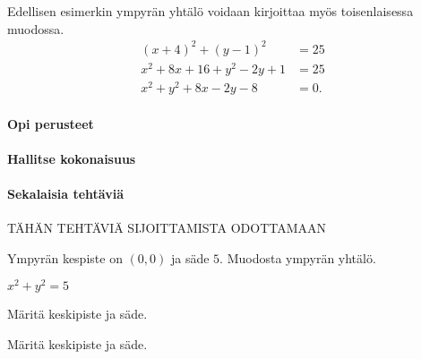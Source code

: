Edellisen esimerkin ympyrän yhtälö voidaan kirjoittaa myös toisenlaisessa muodossa.
\begin{align*}
(x+4)^2+(y-1)^2&=25 \\
x^2+8x+16+y^2-2y+1&=25 \\
x^2+y^2+8x-2y-8&=0.
\end{align*}

\begin{tehtavasivu}

\paragraph*{Opi perusteet}

\paragraph*{Hallitse kokonaisuus}

\paragraph*{Sekalaisia tehtäviä}

TÄHÄN TEHTÄVIÄ SIJOITTAMISTA ODOTTAMAAN

\begin{tehtava}
Ympyrän kespiste on $(0,0)$ ja säde $5$. Muodosta ympyrän yhtälö.
\begin{vastaus}
$x^2+y^2=5$
\end{vastaus}
\end{tehtava}

\begin{tehtava}
Märitä keskipiste ja säde.
\begin{alakohdat}
\end{alakohdat}
\begin{vastaus}
\begin{alakohdat}
\end{alakohdat}
\end{vastaus}
\end{tehtava}

\begin{tehtava}
Märitä keskipiste ja säde.
\begin{alakohdat}
\end{alakohdat}
\begin{vastaus}
\begin{alakohdat}
\end{alakohdat}
\end{vastaus}
\end{tehtava}


\end{tehtavasivu}

